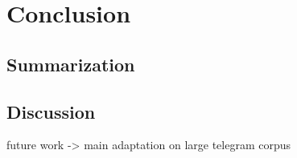 \chapter{Conclusion}
\label{cha:conclusion}
\section{Summarization}
\section{Discussion}

future work -> main adaptation on large telegram corpus
